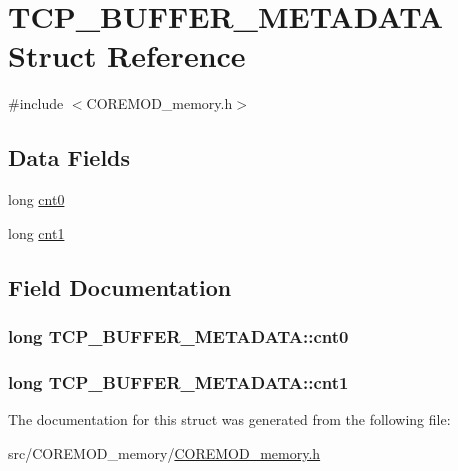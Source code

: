 \hypertarget{structTCP__BUFFER__METADATA}{\section{T\+C\+P\+\_\+\+B\+U\+F\+F\+E\+R\+\_\+\+M\+E\+T\+A\+D\+A\+T\+A Struct Reference}
\label{structTCP__BUFFER__METADATA}
}


{\ttfamily \#include $<$C\+O\+R\+E\+M\+O\+D\+\_\+memory.\+h$>$}

\subsection*{Data Fields}
\begin{DoxyCompactItemize}
\item 
long \hyperlink{structTCP__BUFFER__METADATA_aa44311fef5fa11074406a4079b92de6d}{cnt0}
\item 
long \hyperlink{structTCP__BUFFER__METADATA_a36c43a16ec900e6761222e7f16fc64a1}{cnt1}
\end{DoxyCompactItemize}


\subsection{Field Documentation}
\hypertarget{structTCP__BUFFER__METADATA_aa44311fef5fa11074406a4079b92de6d}{
\subsubsection[{cnt0}]{\setlength{\rightskip}{0pt plus 5cm}long T\+C\+P\+\_\+\+B\+U\+F\+F\+E\+R\+\_\+\+M\+E\+T\+A\+D\+A\+T\+A\+::cnt0}}\label{structTCP__BUFFER__METADATA_aa44311fef5fa11074406a4079b92de6d}
\hypertarget{structTCP__BUFFER__METADATA_a36c43a16ec900e6761222e7f16fc64a1}{
\subsubsection[{cnt1}]{\setlength{\rightskip}{0pt plus 5cm}long T\+C\+P\+\_\+\+B\+U\+F\+F\+E\+R\+\_\+\+M\+E\+T\+A\+D\+A\+T\+A\+::cnt1}}\label{structTCP__BUFFER__METADATA_a36c43a16ec900e6761222e7f16fc64a1}


The documentation for this struct was generated from the following file\+:\begin{DoxyCompactItemize}
\item 
src/\+C\+O\+R\+E\+M\+O\+D\+\_\+memory/\hyperlink{COREMOD__memory_8h}{C\+O\+R\+E\+M\+O\+D\+\_\+memory.\+h}\end{DoxyCompactItemize}
